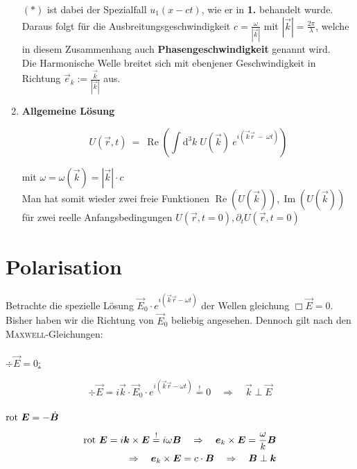 \begin{enumerate}[label=\textbf{\arabic* .}]
$(*)$ ist dabei der Spezialfall $u_1(x-ct)$, wie er in \textbf{1.} behandelt wurde.\\
Daraus folgt für die Ausbreitungsgeschwindigkeit $c =\frac{\omega}{|\vec{k}|}$ mit $|\vec{k}|=\frac{2\pi}{\lambda}$, welche in diesem Zusammenhang auch \textbf{Phasengeschwindigkeit} genannt wird.\\
Die Harmonische Welle breitet sich mit ebenjener Geschwindigkeit in Richtung $\vec{e}_k := \frac{\vec{k}}{|\vec{k}|}$ aus.

\item \textbf{Allgemeine Lösung}

\begin{equation*}
U(\vec{r},t) \ = \ \operatorname{Re} \left(\int\mathrm{d}^3 k \; U(\vec{k}) \ e^{i(\vec{k}\vec{r} \ - \ \omega t)}\right)
\end{equation*}

mit $\omega = \omega(\vec{k}) = |\vec{k}| \cdot c$\\
Man hat somit wieder zwei freie Funktionen $\operatorname{Re}(U(\vec{k})), \operatorname{Im}(U(\vec{k}))$ für zwei reelle Anfangsbedingungen $U(\vec{r},t=0), \partial_t U(\vec{r},t=0)$

\end{enumerate}


\section{Polarisation}

Betrachte die spezielle Lösung $\vec{E}_0 \cdot e^{i(\vec{k}\vec{r} - \omega t)}$ der Wellen gleichung $\Box \vec{E} = 0$. Bisher haben wir die Richtung von $\vec{E}_0$ beliebig angesehen. Dennoch gilt nach den \textsc{Maxwell}-Gleichungen:\
\\
\ \\
\underline{$\div\vec{E} = 0$:}

\begin{equation*}
\div \vec{E} = i\vec{k}\cdot\vec{E}_0 \cdot e^{i(\vec{k}\vec{r} - \omega t)} \overset{!}{=} 0 \quad \Rightarrow \quad \vec{k}\perp\vec{E}
\end{equation*}
\ \\

\underline{$\text{rot }\bm{E} = - \dot{\bm{B}}$}

\begin{align*}
\text{rot }\bm{E} = i\bm{k}\times\bm{E} \overset{!}{=} i \omega\bm{B} \quad \Rightarrow \quad \bm{e}_k\times\bm{E} = \frac{\omega}{k}\bm{B}\\
\Rightarrow\quad\bm{e}_k\times\bm{E} = c \cdot\bm{B} \quad \Rightarrow \quad \bm{B} \perp \bm{k}
\end{align*}

